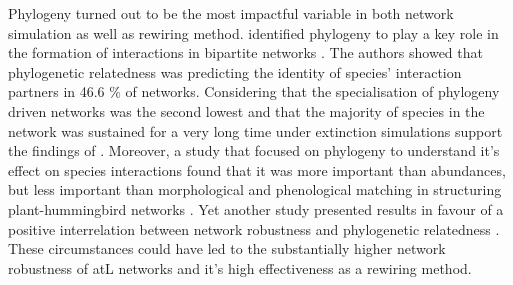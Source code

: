 \documentclass[12pt,a4paper]{article}
\begin{document}
Phylogeny turned out to be the most impactful variable in both network simulation as well as rewiring method. \citeauthor{Rezende2007} identified phylogeny to play a key role in the formation of interactions in bipartite networks \parencite{Rezende2007}. The authors showed that phylogenetic relatedness was predicting the identity of species' interaction partners in 46.6 \% of networks. Considering that the specialisation of phylogeny driven networks was the second lowest and that the majority of species in the network was sustained for a very long time under extinction simulations support the findings of \citeauthor{Rezende2007}. Moreover, a study that focused on phylogeny to understand it's effect on species interactions found that it was more important than abundances, but less important than morphological and phenological matching in structuring plant-hummingbird networks \parencite{Vitoria2018}. Yet another study presented results in favour of a positive interrelation between network robustness and phylogenetic relatedness \parencite{Montesinos-Navarro2019}. These circumstances could have led to the substantially higher network robustness of atL networks and it's high effectiveness as a rewiring method. \paragraph{}

%
%
%
% 
%
%
\end{document}
